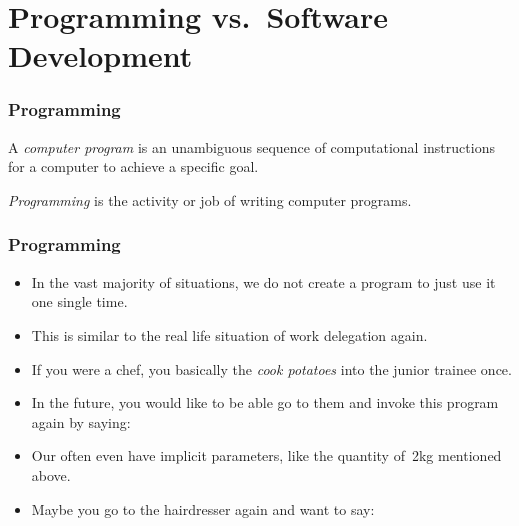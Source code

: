 \documentclass[aspectratio=169,mathserif,notheorems]{beamer}%
\begin{document}
\section{Programming vs.\ Software Development}%
%
\begin{frame}%
\frametitle{Programming}%
%
\begin{definition}%
A \emph{computer program} is an unambiguous sequence of computational instructions for a computer to achieve a specific goal.%
\end{definition}%
%
\begin{definition}[Programming]%
\label{def:programming}
\emph{Programming} is the activity or job of writing computer programs\cite{CDE2024PMOPIE}.%
\end{definition}%
%
\end{frame}%
%

\begin{frame}%
\frametitle{Programming}%
\begin{itemize}%
\item In the vast majority of situations, we do not create a program to just use it one single time.%
\item<2-> This is similar to the real life situation of work delegation again.
\item<3-> If you were a chef, you basically  the  \emph{cook potatoes} into the junior trainee once.
\item<4-> In the future, you would like to be able go to them and invoke this program again by saying:~
\item<5-> Our  often even have implicit parameters, like the quantity of~2kg mentioned above.
\item<6-> Maybe you go to the hairdresser again and want to say: %
\end{itemize}%
\end{frame}%
%
\end{document}

